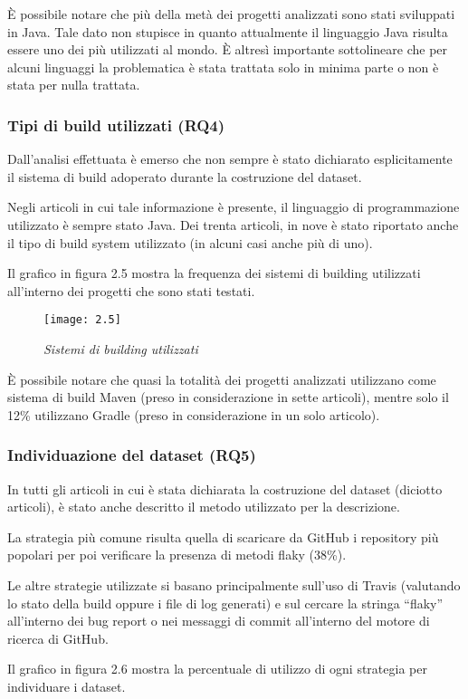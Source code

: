 È possibile notare che più della metà dei progetti analizzati sono stati sviluppati in Java. Tale dato non stupisce in quanto attualmente il linguaggio Java risulta essere uno dei più utilizzati al mondo. È altresì importante sottolineare che per alcuni linguaggi la problematica è stata trattata solo in minima parte o non è stata per nulla trattata.
\subsubsection{Tipi di build utilizzati (RQ4)}
Dall’analisi effettuata è emerso che non sempre è stato dichiarato
esplicitamente il sistema di build adoperato durante la costruzione del dataset.

Negli articoli in cui tale informazione è presente, il linguaggio di programmazione utilizzato è sempre stato Java. Dei trenta articoli, in nove è stato riportato anche il tipo di build system utilizzato (in alcuni casi anche più di uno).

Il grafico in figura 2.5 mostra la frequenza dei sistemi di building utilizzati
all’interno dei progetti che sono stati testati.
\begin{figure}[h]
	\centering
	\texttt{[image: 2.5]}
	\caption{\emph{Sistemi di building utilizzati}}
	\label{fig:mesh1}
\end{figure}

È possibile notare che quasi la totalità dei progetti analizzati utilizzano come sistema di build Maven (preso in considerazione in sette articoli), mentre solo il 12\% utilizzano Gradle (preso in considerazione in un solo articolo).
\subsubsection{Individuazione del dataset (RQ5)}
In tutti gli articoli in cui è stata dichiarata la costruzione del dataset (diciotto articoli), è stato anche descritto il metodo utilizzato per la descrizione.

La strategia più comune risulta quella di scaricare da GitHub i repository più popolari per poi verificare la presenza di metodi flaky (38\%).

Le altre strategie utilizzate si basano principalmente sull’uso di Travis (valutando lo stato della build oppure i file di log generati) e sul cercare la stringa “flaky” all’interno dei bug report o nei messaggi di commit all’interno del motore di ricerca di GitHub.

Il grafico in figura 2.6 mostra la percentuale di utilizzo di ogni strategia per individuare i dataset.

